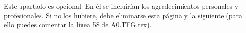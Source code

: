 
\pagestyle{fancy}




Este apartado es opcional. En él se incluirían los agradecimientos personales y profesionales. Si no los hubiere, debe eliminarse esta página y la siguiente (para ello puedes comentar la línea 58 de A0.TFG.tex).

\chapterend


\blankpage
